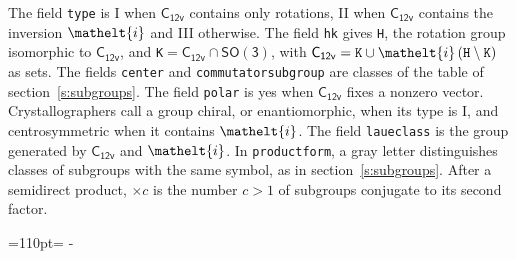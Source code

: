 \documentclass[10pt,a4paper]{article}
\newcommand{\needspace}[1]{\par\penalty-100\begingroup\dimen0=#1\relax\dimen2=\pagegoal
  \advance\dimen2-\pagetotal\ifdim\dimen0>\dimen2\relax\ifdim\dimen2>0pt\vfil\break\fi\fi
  \endgroup}
\numberwithin{equation}{section}
\newcommand{\eltfont}[1]{{\let\sigma\eltsigma\mathelt{#1}}}
\newcommand{\grp}[1]{\mathsf{#1}}
\newcommand{\elt}[1]{\eltfont{#1}}
\begin{document}
\leavevmode\label{n:element.inversion}The field \texttt{type} is I when $\grp{C_{12v}}$ contains only rotations, II when $\grp{C_{12v}}$ contains the inversion $\elt{i}$ and III otherwise. The field \texttt{hk} gives \texttt{H}, the rotation group isomorphic to $\grp{C_{12v}}$, and \texttt{K}${} = \grp{C_{12v}} \cap \grp{SO(3)}$, with $\grp{C_{12v}} = \texttt{K} \cup \elt{i}\,(\texttt{H} \setminus \texttt{K})$ as sets. The fields \texttt{center} and \texttt{commutatorsubgroup} are classes of the table of section~\ref{s:subgroups}. The field \texttt{polar} is yes when $\grp{C_{12v}}$ fixes a nonzero vector. Crystallographers call a group chiral, or enantiomorphic, when its type is I, and centrosymmetric when it contains $\elt{i}$. The field \texttt{laueclass} is the group generated by $\grp{C_{12v}}$ and $\elt{i}$.
In \texttt{productform}, a gray letter distinguishes classes of subgroups with the same symbol, as in section~\ref{s:subgroups}. \label{n:index.conjugates.c}After a semidirect product, ${\times}c$ is the number $c > 1$ of subgroups conjugate to its second factor.
\needspace{110pt}
\end{document}
